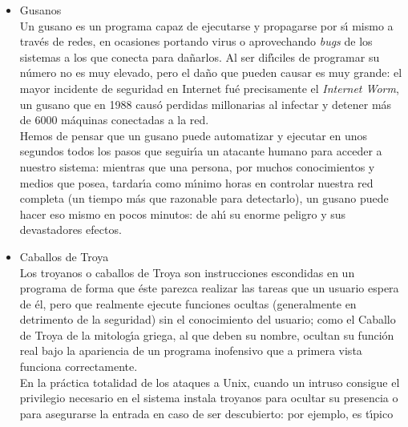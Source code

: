 \begin{itemize}
f\'acilmente cualquier otro mecanismo l\'ogico (que ser\'a el que hay que 
tener en cuenta a la hora de dise\~nar una pol\'{\i}tica de seguridad).\\
Aunque los virus existentes para entornos Unix son m\'as una curiosidad que una 
amenaza real, en sistemas sobre plataformas IBM-PC o compatibles (recordemos que
hay muchos sistemas Unix que operan en estas plataformas, como Linux, FreeBSD,
NetBSD, Minix, Solaris\ldots) ciertos virus, especialmente los de {\it boot}, 
pueden tener efectos nocivos, como da\~nar el sector de arranque; aunque se
trata de da\~nos menores comparados con los efectos de otras amenazas, hay que
tenerlos en cuenta.
\item Gusanos\\
Un gusano es un programa capaz de ejecutarse y propagarse por s\'{\i} mismo a
trav\'es de redes, en ocasiones portando virus o aprovechando {\it bugs} de
los sistemas a los que conecta para da\~narlos. Al ser dif\'{\i}ciles de 
programar su n\'umero no es muy elevado, pero el da\~no que pueden causar es
muy grande: el mayor incidente de seguridad en Internet fu\'e precisamente el
{\it Internet Worm}, un gusano que en 1988 caus\'o perdidas millonarias al
infectar y detener m\'as de 6000 m\'aquinas conectadas a la red.\\
Hemos de pensar que un gusano puede automatizar y ejecutar en unos segundos 
todos los pasos que seguir\'{\i}a un atacante humano para acceder a
nuestro sistema: mientras que una persona, por muchos conocimientos y medios
que posea, tardar\'{\i}a como m\'{\i}nimo horas en controlar nuestra red 
completa (un tiempo m\'as que razonable para detectarlo), un gusano puede hacer
eso mismo en pocos minutos: de ah\'{\i} su enorme peligro y sus devastadores
efectos.
\item Caballos de Troya\\
Los troyanos o caballos de Troya son instrucciones escondidas en un programa de
forma que \'este parezca realizar las tareas que un usuario espera de \'el, 
pero que realmente ejecute funciones ocultas (generalmente en detrimento de
la seguridad) sin
el conocimiento del usuario; como el Caballo de Troya de la mitolog\'{\i}a 
griega, al que deben su nombre, ocultan su funci\'on real bajo la apariencia de
un programa inofensivo que a primera vista funciona correctamente.\\
En la pr\'actica totalidad de los ataques a Unix, cuando un intruso consigue el 
privilegio necesario en el sistema instala troyanos para ocultar su presencia 
o para
asegurarse la entrada en caso de ser descubierto: por ejemplo, es t\'{\i}pico

\end{itemize}
